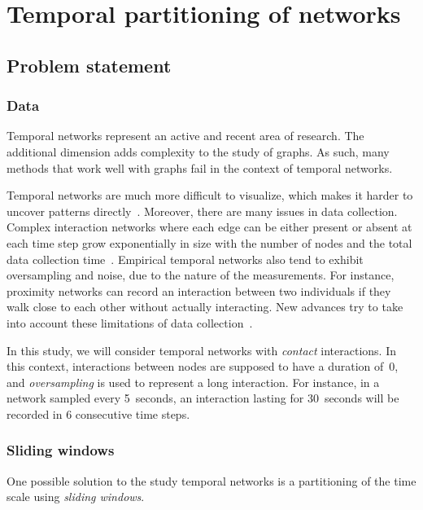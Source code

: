 \documentclass[a4paper,11pt,openany,extrafontsizes]{memoir}
\begin{document}
\chapter{Temporal partitioning of networks}%
\label{cha:temp-part-netw}

\section{Problem statement}%
\label{sec:problem-description}

\subsection{Data}%
\label{sec:data}

Temporal networks represent an active and recent area of research. The
additional dimension adds complexity to the study of graphs. As such,
many methods that work well with graphs fail in the context of
temporal networks.

Temporal networks are much more difficult to visualize, which makes it
harder to uncover patterns
directly~\cite{holme_temporal_2012}. Moreover, there are many issues
in data collection. Complex interaction networks where each edge can
be either present or absent at each time step grow exponentially in
size with the number of nodes and the total data collection
time~\cite{holme_temporal_2012}. Empirical temporal networks also tend
to exhibit oversampling and noise, due to the nature of the
measurements. For instance, proximity networks can record an
interaction between two individuals if they walk close to each other
without actually interacting. New advances try to take into account
these limitations of data collection~\cite{sulo_meaningful_2010,
  newman_network_2018}.

In this study, we will consider temporal networks with \emph{contact}
interactions. In this context, interactions between nodes are supposed
to have a duration of~0, and \emph{oversampling} is used to represent
a long interaction. For instance, in a network sampled every
5~seconds, an interaction lasting for 30~seconds will be recorded in 6
consecutive time steps.

\subsection{Sliding windows}%
\label{sec:sliding-windows}

One possible solution to the study temporal networks is a partitioning
of the time scale using \emph{sliding windows}.
\end{document}
